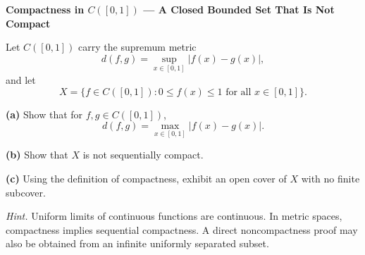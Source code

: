 \begin{problem}[CP-II-0303]
\label{prob:cp-ii-0303}
\textbf{Compactness in \(C([0,1])\) --- A Closed Bounded Set That Is Not Compact}

\hspace*{1.5em}Let \(C([0,1])\) carry the supremum metric
\[
d(f,g)=\sup_{x\in[0,1]}|f(x)-g(x)|,
\]
and let
\[
X=\{f\in C([0,1]):0\le f(x)\le1\text{ for all }x\in[0,1]\}.
\]

\par\smallskip\noindent\textbf{(a)}\quad
Show that for \(f,g\in C([0,1])\),
\[
d(f,g)=\max_{x\in[0,1]}|f(x)-g(x)|.
\]

\par\smallskip\noindent\textbf{(b)}\quad
Show that \(X\) is not sequentially compact.

\par\smallskip\noindent\textbf{(c)}\quad
Using the definition of compactness, exhibit an open cover of \(X\) with no
finite subcover.

\medskip
\noindent\emph{Hint.} Uniform limits of continuous functions are continuous. In metric spaces,
compactness implies sequential compactness. A direct noncompactness proof may
also be obtained from an infinite uniformly separated subset.
\end{problem}

